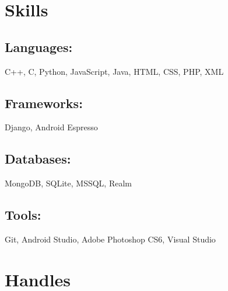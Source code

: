 \documentclass[]{hieudo-build}
\begin{document}
\begin{minipage}[t]{0.3\textwidth}
\section{Skills}
\subsection[Languages]{Languages:}
C++, C, Python, JavaScript, Java, HTML, CSS, PHP, XML\\ 

\subsection[Frameworks]{Frameworks:}
Django, Android Espresso \\

\subsection[Databases]{Databases:}
MongoDB, SQLite, MSSQL, Realm\\

\subsection[Tools]{Tools:}
Git, Android Studio, Adobe Photoshop CS6, Visual Studio \\ 

\sectionsep



\section{Handles}

\end{minipage}
\end{document}
